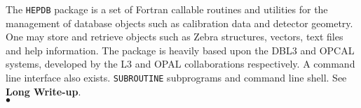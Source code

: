                     
               
               
The {\tt HEPDB} package is a set of Fortran callable routines and
utilities for the management of database objects such as calibration
data and detector geometry. One may store and retrieve objects
such as Zebra structures, vectors, text files and help information.
The package is heavily based upon the DBL3 and OPCAL systems,
developed by the L3 and OPAL collaborations respectively.
A command line interface also exists.
\Structure
{\tt SUBROUTINE} subprograms and command line shell.
\Usage
See {\bf Long Write-up}.
\\ $\bullet$
